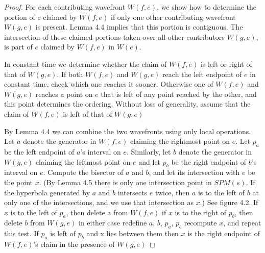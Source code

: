 \begin{proof}
	For each contributing wavefront $W(f,e)$, we show how to determine the
	portion of e claimed by $W(f,e)$ if only one other contributing wavefront
	$W(g,e)$ is present. Lemma 4.4 implies that this portion is contiguous. The
	intersection of these  claimed portions taken over all other contributors
	$W(g,e)$, is part of $e$ claimed by $W(f,e)$ in $W(e)$.

	In constant time we determine whether the claim of $W(f,e)$ is left or right
	of that of $W(g,e)$. If both $W(f,e)$ and $W(g,e)$ reach the left endpoint
	of $e$ in constant time, check which one reaches it sooner. Otherwise one of
	$W(f,e)$ and $W(g,e)$ reaches a point on $e$ that is left of any point
	reached by the other, and this point determines the ordering. Without loss
	of generality, assume that the claim of $W(f,e)$ is left of that of $W(g,e)$

	By Lemma 4.4 we can combine the two wavefronts using only local operations.
	Let $a$ denote the generator in $W(f,e)$ claiming the rightmost point on
	$e$. Let $p_a$ be the left endpoint of $a$'s interval on $e$. Similarly, let
	$b$ denote the generator in $W(g,e)$ claiming the leftmost point on $e$ and
	let $p_b$ be the right endpoint of $b$'s interval on $e$. Compute the
	bisector of $a$ and $b$, and let its intersection with $e$ be the point $x$.
	(By Lemma 4.5 there is only one intersection point in $SPM(s)$. If the
	hyperbola generated by $a$ and $b$ intersects $e$ twice, then $a$ is to the
	left of $b$ at only one of the intersections, and we use that intersection
	as $x$.) See figure 4.2. If $x$ is to the left of $p_a$, then delete a from
	$W(f,e)$ if $x$ is to the right of $p_b$, then delete $b$ from $W(g,e)$ in
	either case redefine $a$, $b$, $p_a$, $p_b$ recompute $x$, and repeat this
	test. If $p_a$ is left of $p_b$ and x lies between them then $x$ is the
	right endpoint of $W(f,e)$'s claim in the presence of $W(g,e)$
	

\end{proof}
